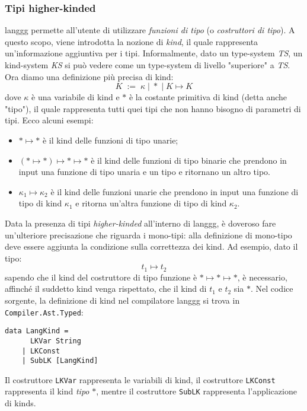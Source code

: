 \documentclass[10pt,a4paper]{article}
\begin{document}
\subsubsection{Tipi higher-kinded}
langgg permette all'utente di utilizzare \textit{funzioni di tipo} (o \textit{costruttori di tipo}). A questo scopo,
viene introdotta la nozione di \textit{kind}, il quale rappresenta un'informazione aggiuntiva per i tipi. Informalmente,
dato un type-system \textit{TS}, un kind-system \textit{KS} si può vedere come un type-system di livello "superiore"
a \textit{TS}. Ora diamo una definizione più precisa di kind:
\[ K \; := \; \kappa \; | \; * \; | \; K \mapsto K \]
dove $ \kappa $ è una variabile di kind e $ * $ è la costante primitiva di kind (detta anche "tipo"), il quale
rappresenta tutti quei tipi che non hanno bisogno di parametri di tipi. Ecco alcuni esempi:
\begin{itemize}
    \item $ * \mapsto * $ è il kind delle funzioni di tipo unarie;
    \item $ (* \mapsto *) \mapsto * \mapsto * $ è il kind delle funzioni di tipo binarie che prendono in input una
    funzione di tipo unaria e un tipo e ritornano un altro tipo.
    \item $ \kappa_1 \mapsto \kappa_2 $ è il kind delle funzioni unarie che prendono in input una funzione di tipo
    di kind $ \kappa_1 $ e ritorna un'altra funzione di tipo di kind $ \kappa_2 $.
\end{itemize}
Data la presenza di tipi \textit{higher-kinded} all'interno di langgg, è doveroso fare un'ulteriore precisazione che
riguarda i mono-tipi: alla definizione di mono-tipo deve essere aggiunta la condizione sulla correttezza dei kind.
Ad esempio, dato il tipo:
\[ t_1 \mapsto t_2 \]
sapendo che il kind del costruttore di tipo funzione è $ * \mapsto * \mapsto * $, è necessario, affinché il suddetto
kind venga rispettato, che il kind di $ t_1 $ e $ t_2 $ sia $ * $.
Nel codice sorgente, la definizione di kind nel compilatore langgg si trova in \texttt{Compiler.Ast.Typed}:
\begin{lstlisting}
data LangKind =
      LKVar String
    | LKConst
    | SubLK [LangKind]
\end{lstlisting}
Il costruttore \texttt{LKVar} rappresenta le variabili di kind, il costruttore \texttt{LKConst} rappresenta il kind
\textit{tipo} $ * $, mentre il costruttore \texttt{SubLK} rappresenta l'applicazione di kinds.
\end{document}
